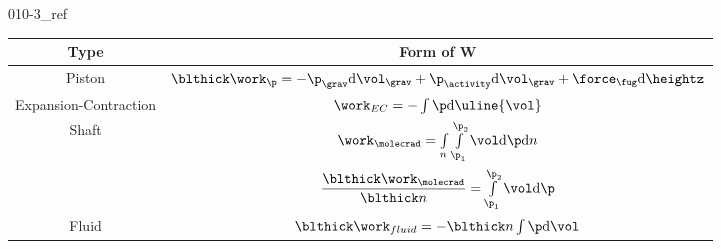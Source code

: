 \begin{mitframe}{010-3_ref}


	\begin{longtable}{|c|c|}
	\hline
	Type & Form of W\\ \hline
    Piston & $\blthick\work_{\p}=-\p_{\grav}\mathrm{d}\vol_{\grav}+\p_{\activity}\mathrm{d}\vol_{\grav}+\force_{\fug}\mathrm{d}\heightz$ \\ \hline
    Expansion-Contraction & $\work_{EC}=-\int\p\mathrm{d}\uline{\vol}$ \\ \hline
   	Shaft & $\work_{\molecrad}=\int\limits_{n}\int\limits_{\p_{1}}^{\p_{2}}\vol\mathrm{d}\p\mathrm{d}n$ \\ 
& $\dfrac{\blthick\work_{\molecrad}}{\blthick n}=\int\limits_{\p_{1}}^{\p_{2}}\vol\mathrm{d}\p$ \\    \hline 
    Fluid & $\blthick\work_{fluid}=-\blthick n\int\p\mathrm{d}\vol$ \\ \hline
   
    \end{longtable}

\end{mitframe}